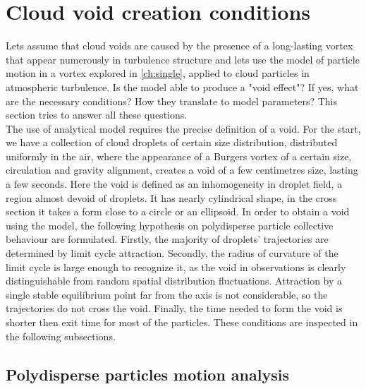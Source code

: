 \documentclass[../main.tex]{subfiles}
\begin{document}
\section{Cloud void creation conditions}
\label{ch4s2}
Lets assume that cloud voids are caused by the presence of a long-lasting vortex that appear numerously in turbulence structure and lets use the model of particle motion in a vortex explored in \autoref{ch:single}, applied to cloud particles in atmospheric turbulence. Is the model able to produce a "void effect"? If yes, what are the necessary conditions? How they translate to model parameters? This section tries to answer all these questions.\\
The use of analytical model requires the precise definition of a void. For the start, we have a collection of cloud droplets of certain size distribution, distributed uniformly in the air, where the appearance of a Burgers vortex of a certain size, circulation and gravity alignment, creates a void of a few centimetres size, lasting a few seconds. Here the void is defined as an inhomogeneity in droplet field, a region almost devoid of droplets. It has nearly cylindrical shape, in the cross section it takes a form close to a circle or an ellipsoid. In order to obtain a void using the model, the following hypothesis on polydisperse particle collective behaviour are formulated. Firstly, the majority of droplets' trajectories are determined by limit cycle attraction. Secondly, the radius of curvature of the limit cycle is large enough to recognize it, as the void in observations is clearly distinguishable from random spatial distribution fluctuations. Attraction by a single stable equilibrium point far from the axis is not considerable, so the trajectories do not cross the void. Finally, the time needed to form the void is shorter then exit time for most of the particles. These conditions are inspected in the following subsections.

\subsection{Polydisperse particles motion analysis}
\label{ssec:poly}
\end{document}
